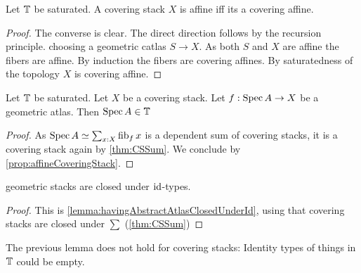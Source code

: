\begin{prop}{\label{prop:affineCoveringStack}}
	Let $\mathbb{T}$ be saturated.
	A covering stack $X$ is affine iff its a covering affine.
\end{prop}
\begin{proof}
	The converse is clear. The direct direction follows by the recursion principle. choosing a geometric catlas  $S \to X$. As both $S$ and $X$ are affine the fibers are affine. By induction the fibers are covering affines. By saturatedness of the topology $X$ is covering affine.
\end{proof}
\begin{lemma}{\label{lemma:atlasIsCatlas}}
	Let $\mathbb{T}$ be saturated. Let $X$ be a covering stack. Let $f : \operatorname{Spec} A \to X$ be a geometric atlas. Then $\operatorname{Spec} A \in \mathbb{T}$
\end{lemma}
\begin{proof}
	As $\operatorname{Spec} A \simeq \sum_{x : X} \operatorname{fib}_f x$ is a dependent sum of covering stacks, it is a covering stack again by \ref{thm:CSSum}. We conclude by \ref{prop:affineCoveringStack}.
\end{proof}	


\begin{lemma}{\label{lemma:geometricStacksClosedUnderId}}
	geometric stacks are closed under $\operatorname{id}$-types.
\end{lemma}
\begin{proof}
	
	This is \ref{lemma:havingAbstractAtlasClosedUnderId}, using that covering stacks are closed under $\sum$ (\ref{thm:CSSum})
\end{proof}

\begin{warning}
	The previous lemma does not hold for covering stacks: Identity types of things in $\mathbb{T}$ could be empty.
\end{warning}

